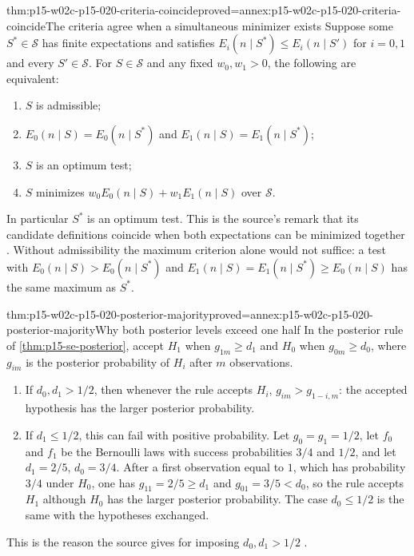 \begin{hbtheorem}{thm:p15-w02c-p15-020-criteria-coincide}{proved=annex:p15-w02c-p15-020-criteria-coincide}{The criteria agree when a simultaneous minimizer exists}
Suppose some \(S^*\in\mathcal S\) has finite expectations and
satisfies \(E_i(n\mid S^*)\leq E_i(n\mid S')\) for \(i=0,1\) and every
\(S'\in\mathcal S\). For \(S\in\mathcal S\) and any fixed
\(w_0,w_1>0\), the following are equivalent:
\begin{enumerate}
\item \(S\) is admissible;
\item \(E_0(n\mid S)=E_0(n\mid S^*)\) and \(E_1(n\mid S)=E_1(n\mid S^*)\);
\item \(S\) is an optimum test;
\item \(S\) minimizes \(w_0E_0(n\mid S)+w_1E_1(n\mid S)\) over \(\mathcal S\).
\end{enumerate}
In particular \(S^*\) is an optimum test. This is the source's remark
that its candidate definitions coincide when both expectations can be
minimized together \cite[Section 2.2, p.~124]{Wald1945SequentialTests}.
Without admissibility the maximum criterion alone would not suffice:
a test with \(E_0(n\mid S)>E_0(n\mid S^*)\) and
\(E_1(n\mid S)=E_1(n\mid S^*)\geq E_0(n\mid S)\) has the same maximum
as \(S^*\).
\end{hbtheorem}

\begin{hbtheorem}{thm:p15-w02c-p15-020-posterior-majority}{proved=annex:p15-w02c-p15-020-posterior-majority}{Why both posterior levels exceed one half}
In the posterior rule of \cref{thm:p15-se-posterior}, accept \(H_1\)
when \(g_{1m}\geq d_1\) and \(H_0\) when \(g_{0m}\geq d_0\), where
\(g_{im}\) is the posterior probability of \(H_i\) after \(m\)
observations.
\begin{enumerate}
\item If \(d_0,d_1>1/2\), then whenever the rule accepts \(H_i\),
 \(g_{im}>g_{1-i,m}\): the accepted hypothesis has the larger
 posterior probability.
\item If \(d_1\leq1/2\), this can fail with positive probability.
 Let \(g_0=g_1=1/2\), let \(f_0\) and \(f_1\) be the Bernoulli laws
 with success probabilities \(3/4\) and \(1/2\), and let
 \(d_1=2/5\), \(d_0=3/4\). After a first observation equal to \(1\),
 which has probability \(3/4\) under \(H_0\), one has
 \(g_{11}=2/5\geq d_1\) and \(g_{01}=3/5<d_0\), so the rule accepts
 \(H_1\) although \(H_0\) has the larger posterior probability.
 The case \(d_0\leq1/2\) is the same with the hypotheses exchanged.
\end{enumerate}
This is the reason the source gives for imposing
\(d_0,d_1>1/2\) \cite[Section 3.1, p.~126, footnote 7]{Wald1945SequentialTests}.
\end{hbtheorem}

